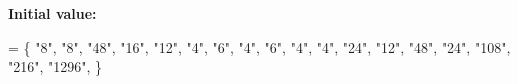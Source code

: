 {\bfseries Initial value\+:}
\begin{DoxyCode}
= \{
    \textcolor{stringliteral}{"8"},
    \textcolor{stringliteral}{"8"},
    \textcolor{stringliteral}{"48"},
    \textcolor{stringliteral}{"16"},
    \textcolor{stringliteral}{"12"},
    \textcolor{stringliteral}{"4"},
    \textcolor{stringliteral}{"6"},
    \textcolor{stringliteral}{"4"},
    \textcolor{stringliteral}{"6"},
    \textcolor{stringliteral}{"4"},
    \textcolor{stringliteral}{"4"},
    \textcolor{stringliteral}{"24"},
    \textcolor{stringliteral}{"12"},
    \textcolor{stringliteral}{"48"},
    \textcolor{stringliteral}{"24"},
    \textcolor{stringliteral}{"108"},
    \textcolor{stringliteral}{"216"},
    \textcolor{stringliteral}{"1296"},
\}
\end{DoxyCode}
